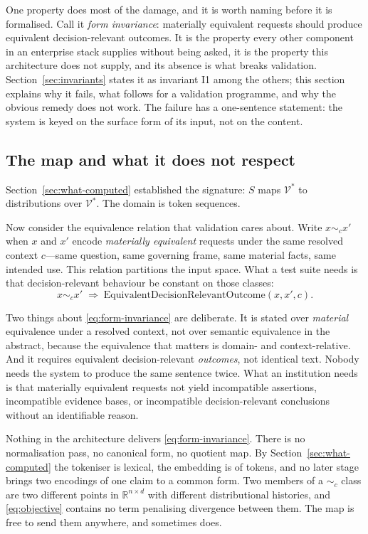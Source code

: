 \documentclass[11pt]{article}
\theoremstyle{plain}
\theoremstyle{definition}
\begin{document}
One property does most of the damage, and it is worth naming before it is formalised.
Call it \emph{form invariance}: materially equivalent requests should produce equivalent
decision-relevant outcomes. It is the property every other component in an enterprise
stack supplies without being asked, it is the property this architecture does not supply,
and its absence is what breaks validation. Section~\ref{sec:invariants} states it as
invariant I1 among the others; this section explains why it fails, what follows for a
validation programme, and why the obvious remedy does not work. The failure has a
one-sentence statement: the system is keyed on the surface form of its input, not on the
content.

\subsection{The map and what it does not respect}

Section~\ref{sec:what-computed} established the signature: $S$ maps
$\mathcal{V}^{*}$ to distributions over $\mathcal{V}^{*}$. The domain is token
sequences.

Now consider the equivalence relation that validation cares about. Write
$x \sim_c x'$ when $x$ and $x'$ encode \emph{materially equivalent} requests under
the same resolved context $c$---same question, same governing frame, same material
facts, same intended use. This relation partitions the input space. What a test
suite needs is that decision-relevant behaviour be constant on those classes:
\begin{equation}
  x \sim_c x' \;\Longrightarrow\; \text{EquivalentDecisionRelevantOutcome}(x, x', c).
  \label{eq:form-invariance}
\end{equation}

Two things about \eqref{eq:form-invariance} are deliberate. It is stated over
\emph{material} equivalence under a resolved context, not over semantic
equivalence in the abstract, because the equivalence that matters is domain- and
context-relative. And it requires equivalent decision-relevant \emph{outcomes},
not identical text. Nobody needs the system to produce the same sentence twice.
What an institution needs is that materially equivalent requests not yield
incompatible assertions, incompatible evidence bases, or incompatible
decision-relevant conclusions without an identifiable reason.

Nothing in the architecture delivers \eqref{eq:form-invariance}. There is no
normalisation pass, no canonical form, no quotient map. By
Section~\ref{sec:what-computed} the tokeniser is lexical, the embedding is of
tokens, and no later stage brings two encodings of one claim to a common form. Two
members of a $\sim_c$ class are two different points in $\mathbb{R}^{n \times d}$
with different distributional histories, and \eqref{eq:objective} contains no term
penalising divergence between them. The map is free to send them anywhere, and
sometimes does.
\end{document}
